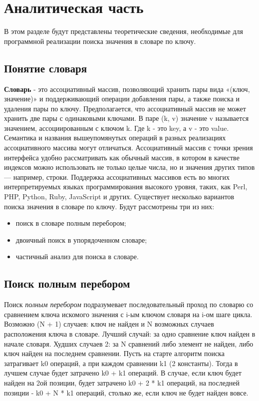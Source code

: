 \documentclass[12pt]{report}
\begin{document}
\chapter{Аналитическая часть}

В этом разделе будут представлены теоретические сведения, необходимые для программной реализации поиска значения в словаре по ключу.
 
\section{Понятие словаря}
 \textbf{Словарь} - это ассоциативный массив, позволяющий хранить пары вида «(ключ, значение)» и поддерживающий операции добавления пары, а также поиска и удаления пары по ключу. Предполагается, что ассоциативный массив не может хранить две пары с одинаковыми ключами. В паре (k, v) значение v называется значением, ассоциированным с ключом k. Где k - это key, а v - это value.  Семантика и названия вышеупомянутых операций в разных реализациях ассоциативного массива могут отличаться\cite{AssocArray}.
Ассоциативный массив с точки зрения интерфейса удобно рассматривать как обычный массив, в котором в качестве индексов можно использовать не только целые числа, но и значения других типов — например, строки.
Поддержка ассоциативных массивов есть во многих интерпретируемых языках программирования высокого уровня, таких, как Perl\cite{Perl}, PHP\cite{Php}, Python\cite{Python}, Ruby\cite{Ruby}, JavaScript\cite{JS} и других.
Существует несколько вариантов поиска значения в словаре по ключу. Будут рассмотрены три из них:
\begin{itemize}
\item поиск в словаре полным перебором;
\item двоичный поиск в упорядоченном словаре;
\item частичный анализ для поиска в словаре.
\end{itemize}

\section{Поиск полным перебором}
Поиск \textit{полным перебором} подразумевает последовательный проход по словарю со сравнением ключа искомого значения с i-ым ключом словаря на i-ом шаге цикла. Возможно (N + 1) случаев: ключ не найден и N возможных случаев расположения ключа в словаре. Лучший случай: за одно сравнение ключ найден в начале словаря. Худших случаев 2: за N сравнений либо элемент не найден, либо ключ найден на последнем сравнении. Пусть на старте алгоритм поиска затрагивает k0 операций, а при каждом сравнении k1 (2 константы). Тогда в лучшем случае будет затрачено k0 + k1 операций. В случае, если ключ будет найден на 2ой позиции, будет затрачено k0 + 2 * k1 операций, на последней позиции - k0 + N * k1 операций, столько же, если ключ не будет найден вовсе. 	
\end{document}

